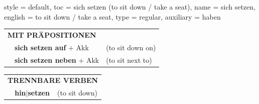 \begin{verbentry}{
  style = {default},
  toc = {sich setzen (to sit down / take a seat)},
  name = {sich setzen},
  english = {to sit down / take a seat},
  type = {regular},
  auxiliary = {haben}
}
\vspace{10pt}

\begin{tabular}{lll}
\multicolumn{3}{l}{\textbf{MIT PRÄPOSITIONEN}}\\
& \textbf{sich setzen auf} + Akk & (to sit down on)\\
& \textbf{sich setzen neben} + Akk & (to sit next to)\\
\end{tabular}
\hfill
\begin{tabular}{lll}
\multicolumn{3}{l}{\textbf{TRENNBARE VERBEN}}\\
& \textbf{hin$|$setzen} & (to sit down)\\
\end{tabular}
\vspace{-5pt}
\end{verbentry}

